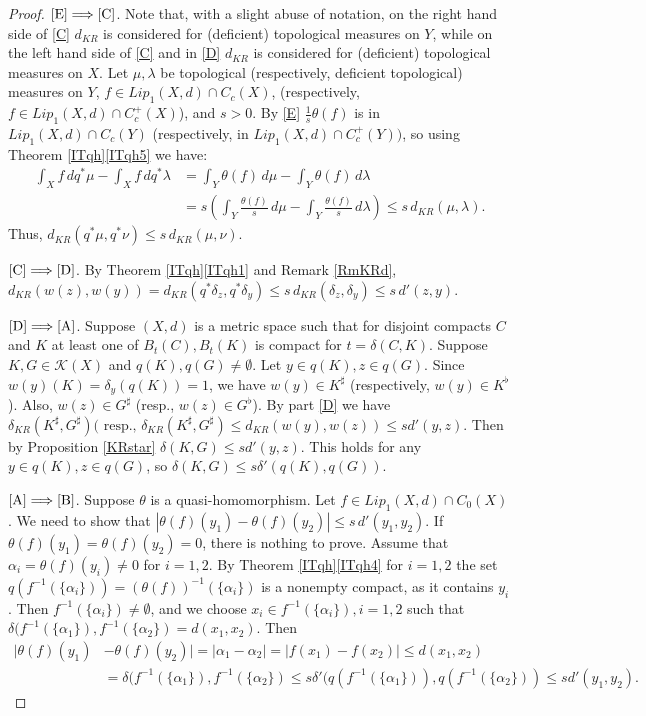 \documentclass[sn-mathphys-num]{sn-jnl}%
\theoremstyle{thmstyleone}%
\theoremstyle{definition}
\begin{document}
\begin{proof}
$\ref{E} \Longrightarrow \ref{C}$. 
Note that, with a slight abuse of notation, 
on the right hand side of \ref{C} $d_{KR}$ is considered for (deficient) topological measures on $Y$, while on the left hand side of  \ref{C} and in 
\ref{D} $d_{KR}$ is considered for  (deficient) topological measures on $X$.
Let $\mu, \lambda$ be topological  (respectively, deficient topological) measures  on $Y$, 
$ f \in Lip_1(X, d) \cap C_c(X)$, (respectively,  $ f \in Lip_1(X, d) \cap C_c^+(X)$), and $s >0$.
By \ref{E}  $\frac1s \theta(f)$ is in  $ Lip_1(X, d) \cap C_c(Y)$ (respectively, in $Lip_1(X, d) \cap C_c^+(Y) )$,   
so using Theorem \ref{ITqh}\ref{ITqh5}  we have:
\begin{align*}
\int_X f\, dq^*\mu -  \int_X f\, dq^*\lambda &= \int_Y \theta(f) \, d\mu -  \int_Y \theta(f) \, d\lambda \\
&= s \left( \int_Y \frac{\theta(f)}{s} \, d\mu -  \int_Y \frac{\theta(f)}{s} \, d\lambda \right) \le s\, d_{KR}(\mu, \lambda).
\end{align*} 
Thus, $d_{KR} (q^*\mu, q^*\nu) \le s\, d_{KR} (\mu, \nu)$.

$\ref{C}  \Longrightarrow  \ref{D}$.
By Theorem \ref{ITqh}\ref{ITqh1}  and  Remark \ref{RmKRd},
$d_{KR}(w(z), w(y)) = d_{KR}(q^*\delta_z, q^*\delta_y)  \le s\, d_{KR}(\delta_z, \delta_y) \le s\, d'(z,y).$ 

$\ref{D}  \Longrightarrow  \ref{A}$. 
Suppose $(X,d)$ is a metric space such that for disjoint compacts $C$ and $K$ at least one of $B_t(C), B_t(K)$ is compact for $ t = \delta(C,K)$.
Suppose $K, G \in \mathscr{K}(X)$ and $q(K), q(G) \neq \emptyset$. Let $y \in q(K), z \in q(G)$. 
Since $w(y)(K) = \delta_y(q(K)) = 1$, we have $w(y) \in  K^\sharp$ (respectively, $w(y) \in  K^\flat$).  
Also, $w(z) \in G^\sharp$ (resp.,  $w(z) \in G^\flat$).
By part \ref{D}  we have $\delta_{KR} (K^\sharp, G^\sharp) (\text{ resp., } \delta_{KR} (K^\sharp, G^\sharp) \le  d_{KR} (w(y), w(z)) \le s d'(y,z)$. 
Then by Proposition \ref{KRstar} 
$\delta(K, G) \le s d'(y,z)$. 
This holds for any  $y \in q(K), z \in q(G)$, so $\delta(K, G) \le s \delta' (q(K), q(G))$.

$\ref{A} \Longrightarrow \ref{B}$. Suppose $ \theta$ is a quasi-homomorphism. 
Let $ f \in Lip_1(X,d) \cap C_0(X)$. 
We need to show that $ |\theta(f) (y_1) - \theta(f) (y_2)| \le s\, d'(y_1, y_2)$.
If $\theta(f) (y_1) = \theta(f) (y_2) = 0$, there is nothing to prove. Assume that $ \alpha_i =  \theta(f) (y_i) \neq 0$ for $i=1,2$.
By Theorem \ref{ITqh}\ref{ITqh4} for $i=1,2$ the set $ q( f^{-1}(\{ \alpha_i \} )) = (\theta(f))^{-1}(\{ \alpha_i\}) $ is a
nonempty compact, as it contains $y_i$. Then $f^{-1}(\{ \alpha_i \} ) \neq \emptyset$, and we
choose $x_i \in  f^{-1}(\{ \alpha_i\}),  i=1,2$ such that $\delta( f^{-1}(\{\alpha_1\}), f^{-1}(\{ \alpha_2\}) = d(x_1, x_2)$.
Then
\begin{align*}
|\theta(f) (y_1) &- \theta(f) (y_2)|  = |\alpha_1 - \alpha_2| = | f(x_1) - f(x_2)|  \le d(x_1, x_2)  \\
& = \delta( f^{-1}(\{\alpha_1\}), f^{-1}(\{ \alpha_2\})  \le s \delta'( q(f^{-1}(\{\alpha_1\})), q(f^{-1}(\{ \alpha_2\})) \le s d'(y_1, y_2).
\end{align*}


\end{proof}
\end{document}
